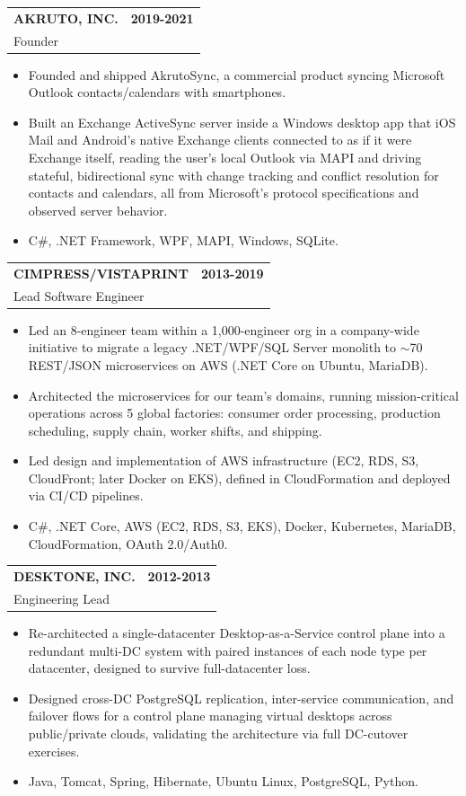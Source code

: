 \documentclass[11pt]{article}
\makeatletter
\newcommand{\IF}[2]{\iftoggle{#1}{#2}{}}
\newcommand{\jobheading}[4]{%
  \vspace{6pt}\begin{tabularx}{\textwidth}{@{}X r@{}}
    {\textbf{#1}} & {\textbf{#2}} \\
    {{\normalsize #3}\hspace{0.5em}{\color{muted}·}\hspace{0.5em}{\color{muted}#4}} & {} \\
  \end{tabularx}\vspace{2pt}
}
\makeatother
\begin{document}
\jobheading{AKRUTO, INC.}{2019-2021}{Founder}{Needham, MA}
\begin{itemize}
\item Founded and shipped AkrutoSync, a commercial product syncing Microsoft Outlook contacts/calendars with smartphones.
\item Built an Exchange ActiveSync server inside a Windows desktop app that iOS Mail and Android's native Exchange clients connected to as if it were Exchange itself, reading the user's local Outlook via MAPI and driving stateful, bidirectional sync with change tracking and conflict resolution for contacts and calendars, all from Microsoft's protocol specifications and observed server behavior.
\item C\#, .NET Framework, WPF, MAPI, Windows, SQLite.
\end{itemize}

\jobheading{CIMPRESS/VISTAPRINT}{2013-2019}{Lead Software Engineer}{Waltham, MA}
\begin{itemize}
\item Led an 8-engineer team within a 1,000-engineer org in a company-wide initiative to migrate a legacy .NET/WPF/SQL Server monolith to $\sim$70 REST/JSON microservices on AWS (.NET Core on Ubuntu, MariaDB).
\item Architected the microservices for our team's domains, running mission-critical operations across 5 global factories: consumer order processing, production scheduling, supply chain, worker shifts, and shipping.
\item Led design and implementation of AWS infrastructure (EC2, RDS, S3, CloudFront; later Docker on EKS), defined in CloudFormation and deployed via CI/CD pipelines.
\IF{EMBEDDED}{\item Integrated digital printing presses and embroidery machines via vendor protocols and custom interfaces.}%
\item C\#, .NET Core, AWS (EC2, RDS, S3, EKS), Docker, Kubernetes, MariaDB, CloudFormation, OAuth 2.0/Auth0.
\end{itemize}

\jobheading{DESKTONE, INC.}{2012-2013}{Engineering Lead}{Lexington, MA}
\begin{itemize}
\item Re-architected a single-datacenter Desktop-as-a-Service control plane into a redundant multi-DC system with paired instances of each node type per datacenter, designed to survive full-datacenter loss.
\item Designed cross-DC PostgreSQL replication, inter-service communication, and failover flows for a control plane managing virtual desktops across public/private clouds, validating the architecture via full DC-cutover exercises.
\item Java, Tomcat, Spring, Hibernate, Ubuntu Linux, PostgreSQL, Python.
\end{itemize}
\end{document}
